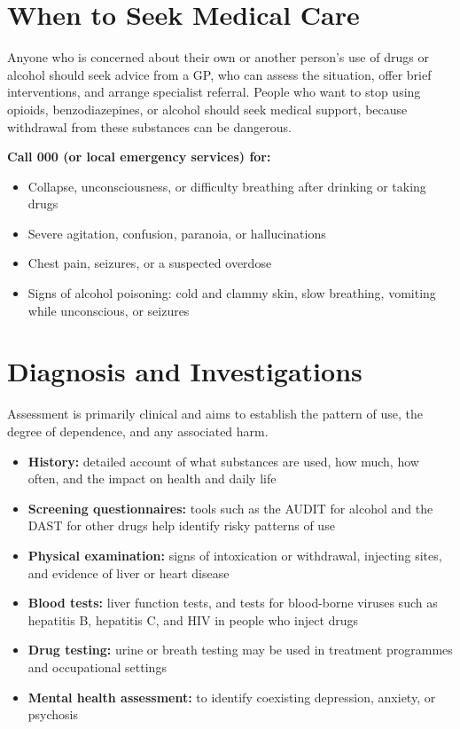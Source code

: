 \section*{When to Seek Medical Care}
Anyone who is concerned about their own or another person's use of drugs or alcohol should seek advice from a GP, who can assess the situation, offer brief interventions, and arrange specialist referral. People who want to stop using opioids, benzodiazepines, or alcohol should seek medical support, because withdrawal from these substances can be dangerous.

\textbf{Call 000 (or local emergency services) for:}
\begin{itemize}
    \item Collapse, unconsciousness, or difficulty breathing after drinking or taking drugs
    \item Severe agitation, confusion, paranoia, or hallucinations
    \item Chest pain, seizures, or a suspected overdose
    \item Signs of alcohol poisoning: cold and clammy skin, slow breathing, vomiting while unconscious, or seizures
\end{itemize}

\section*{Diagnosis and Investigations}
Assessment is primarily clinical and aims to establish the pattern of use, the degree of dependence, and any associated harm.
\begin{itemize}
    \item \textbf{History:} detailed account of what substances are used, how much, how often, and the impact on health and daily life
    \item \textbf{Screening questionnaires:} tools such as the AUDIT for alcohol and the DAST for other drugs help identify risky patterns of use
    \item \textbf{Physical examination:} signs of intoxication or withdrawal, injecting sites, and evidence of liver or heart disease
    \item \textbf{Blood tests:} liver function tests, and tests for blood-borne viruses such as hepatitis B, hepatitis C, and HIV in people who inject drugs
    \item \textbf{Drug testing:} urine or breath testing may be used in treatment programmes and occupational settings
    \item \textbf{Mental health assessment:} to identify coexisting depression, anxiety, or psychosis
\end{itemize}

